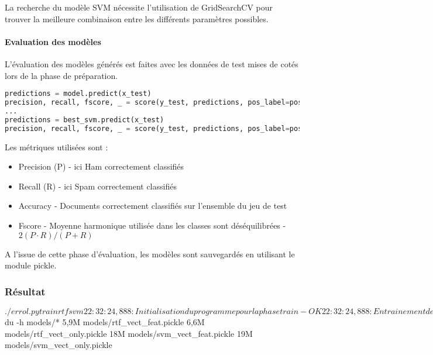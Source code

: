         La recherche du modèle SVM nécessite l'utilisation de GridSearchCV pour trouver la meilleure combinaison entre les différents paramètres possibles.


    \paragraph{Evaluation des modèles}
        L'évaluation des modèles générés est faites avec les données de test mises de cotés lors de la phase de préparation.
        \begin{lstlisting}[title=Evaluation des modèles, language=Python,label={lst:train}]
predictions = model.predict(x_test)
precision, recall, fscore, _ = score(y_test, predictions, pos_label=pos_label, average='binary')
...
predictions = best_svm.predict(x_test)
precision, recall, fscore, _ = score(y_test, predictions, pos_label=pos_label, average='binary')
        \end{lstlisting}
        Les métriques utilisées sont :
        \begin{itemize}
            \item Precision (P) - ici Ham correctement classifiés
            \item Recall (R) - ici Spam correctement classifiés
            \item Accuracy - Documents correctement classifiés sur l'ensemble du jeu de test
            \item Fscore - Moyenne harmonique utilisée dans les classes sont déséquilibrées - $2(P \cdot R)/(P + R)$
        \end{itemize}

        A l'issue de cette phase d'évaluation, les modèles sont sauvegardés en utilisant le module pickle.

    \subsubsection{Résultat}
\begin{verbatimtab}
$ ./errol.py train rtf svm
22:32:24,888 : Initialisation du programme pour la phase train - OK
22:32:24,888 : Entrainement des modèles
22:32:24,888 : Récupération des caractéristiques
22:32:26,068 : Nombre de messages: 5333 - Nombre de caractéristiques: 2951
22:32:28,439 : ID pour les ham - 1
22:32:28,439 : RandomTree Forest avec les vecteurs tfidf et caractéristiques
22:32:28,868 : RandomTree Forest avec les vecteurs tfidf seulement
22:32:29,314 : Support Vector Machine avec les vecteurs tfidf et caractéristiques
22:38:44,097 : Support Vector Machine avec les vecteurs tfidf seulement
22:45:06,374 : rtf_vect_feat - Prec: 0.981 - Rec: 0.996 - Acc: 0.984 - Fsc: 0.989
22:45:06,388 : rtf_vect_only - Prec: 0.981 - Rec: 0.981 - Acc: 0.973 - Fsc: 0.981
22:45:06,402 : svm_vect_feat - Prec: 0.984 - Rec: 0.991 - Acc: 0.982 - Fsc: 0.987
22:45:06,430 : svm_vect_only - Prec: 0.982 - Rec: 0.991 - Acc: 0.981 - Fsc: 0.986

$ du -h models/*
5,9M	models/rtf_vect_feat.pickle
6,6M	models/rtf_vect_only.pickle
18M	models/svm_vect_feat.pickle
19M	models/svm_vect_only.pickle
\end{verbatimtab}


